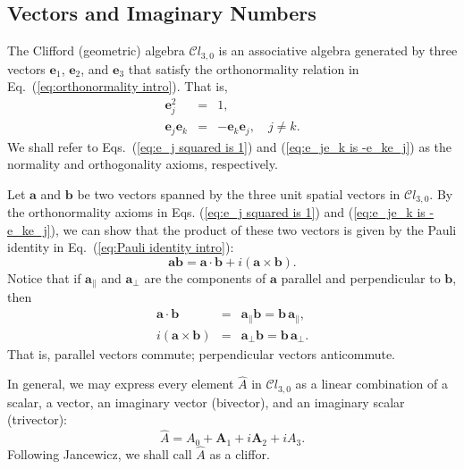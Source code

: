 \documentclass[11pt,twocolumn]{article}
\begin{document}
\subsection{Vectors and Imaginary Numbers}

The Clifford (geometric) algebra $\mathcal Cl_{3,0}$ is an associative algebra generated by three vectors ${\mathbf e}_1$, ${\mathbf e}_2$, and ${\mathbf e}_3$ that satisfy the orthonormality relation in Eq.~(\ref{eq:orthonormality intro}).  That is, 
\begin{eqnarray}
\label{eq:e_j squared is 1}
\mathbf e_j^2 &=& 1,\\
\label{eq:e_je_k is -e_ke_j}
\mathbf e_j\mathbf e_k&=&-\mathbf e_k\mathbf e_j,\quad j\neq k.
\end{eqnarray}
We shall refer to Eqs.~(\ref{eq:e_j squared is 1}) and (\ref{eq:e_je_k is -e_ke_j}) as the normality and orthogonality axioms, respectively.

Let ${\mathbf a}$ and ${\mathbf b}$ be two vectors spanned by the three unit spatial vectors in $\mathcal Cl_{3,0}$.  By the orthonormality axioms in Eqs. (\ref{eq:e_j squared is 1}) and (\ref{eq:e_je_k is -e_ke_j}), we can show that the product of these two vectors is given by the Pauli identity in Eq.~(\ref{eq:Pauli identity intro}):
\begin{equation}
\label{eq:Pauli identity}
\mathbf a\mathbf b=\mathbf a\cdot\mathbf b+i(\mathbf a\times\mathbf b).
\end{equation}
  Notice that if $\mathbf a_\parallel$ and $\mathbf a_\perp$ are the components of $\mathbf a$ parallel and perpendicular to $\mathbf b$, then 
\begin{eqnarray}
\label{eq:a parallel b is b a parallel}
\mathbf a\cdot\mathbf b&=&\mathbf a_\parallel\mathbf b=\mathbf b\,\mathbf a_\parallel,\\
\label{eq:a perp b is - b a perp}
i(\mathbf a\times\mathbf b)&=&\mathbf a_\perp\mathbf b=\mathbf b\,\mathbf a_\perp.
\end{eqnarray}
That is, parallel vectors commute; perpendicular vectors anticommute.


In general, we may express every element $\hat A$ in $\mathcal Cl_{3,0}$ as a linear combination of a scalar, a vector, an imaginary vector (bivector), and an imaginary scalar (trivector):
\begin{equation}
\label{eq:cliffor A}
\hat A = A_0 + {\mathbf A}_1 +i{\mathbf A}_2 + iA_3.
\end{equation}
Following Jancewicz, we shall call $\hat A$ as a cliffor\cite{Jancewicz_1988_MultivectorstoCliffordAlgebrainElectrodynamics_p28}.
\end{document}
